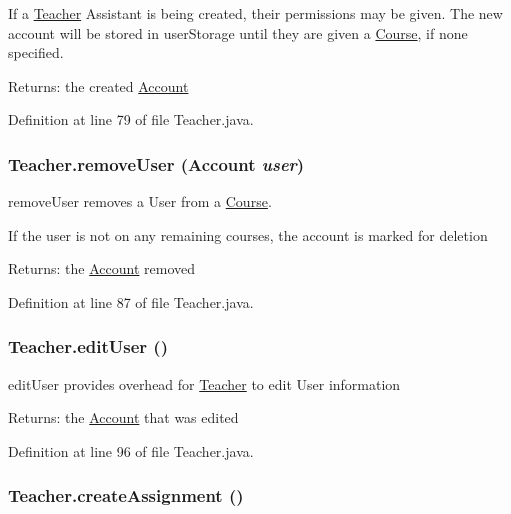 If a \hyperlink{classTeacher}{Teacher} Assistant is being created, their permissions may be given. The new account will be stored in userStorage until they are given a \hyperlink{classCourse}{Course}, if none specified. \begin{Desc}
\item[Returns:]the created \hyperlink{classAccount}{Account} \end{Desc}


Definition at line 79 of file Teacher.java.\hypertarget{classTeacher_59fe81a1fc82001e8900f1aad53be32c}{
\subsubsection{ Teacher.removeUser ({\bf Account} {\em user})}}
\label{classTeacher_59fe81a1fc82001e8900f1aad53be32c}


removeUser removes a User from a \hyperlink{classCourse}{Course}. 

If the user is not on any remaining courses, the account is marked for deletion \begin{Desc}
\item[Returns:]the \hyperlink{classAccount}{Account} removed \end{Desc}


Definition at line 87 of file Teacher.java.\hypertarget{classTeacher_5d5be5a2ae64b675db80e17d83bfb5df}{
\subsubsection{ Teacher.editUser ()}}
\label{classTeacher_5d5be5a2ae64b675db80e17d83bfb5df}


editUser provides overhead for \hyperlink{classTeacher}{Teacher} to edit User information 

\begin{Desc}
\item[Returns:]the \hyperlink{classAccount}{Account} that was edited \end{Desc}


Definition at line 96 of file Teacher.java.\hypertarget{classTeacher_d74b81653f3e262d69b3aea9ceccbcbf}{
\subsubsection{ Teacher.createAssignment ()}}
\label{classTeacher_d74b81653f3e262d69b3aea9ceccbcbf}


